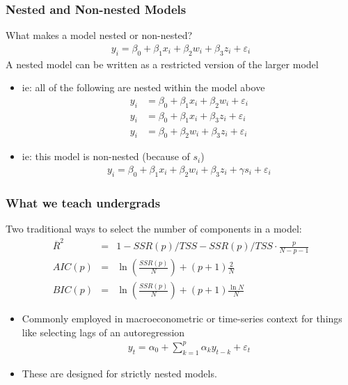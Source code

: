 \documentclass[xcolor=pdftex,dvipsnames,table,mathserif,aspectratio=169]{beamer}
\begin{document}
\begin{frame}
\frametitle{Nested and Non-nested Models}
What makes a model \alert{nested} or \alert{non-nested}?
\begin{align*}
y_i = \beta_0 + \beta_1 x_i + \beta_2 w_i + \beta_3 z_i + \varepsilon_i 
\end{align*}
A nested model can be written as a restricted version of the larger model
\begin{itemize}
\item ie: all of the following are nested within the model above
\begin{align*}
y_i &= \beta_0 + \beta_1 x_i + \beta_2 w_i + \varepsilon_i  \\
y_i &= \beta_0 + \beta_1 x_i + \beta_3 z_i + \varepsilon_i  \\
y_i &= \beta_0 + \beta_2 w_i + \beta_3 z_i + \varepsilon_i  
\end{align*}
\item ie: this model is non-nested (because of $s_i$)
\begin{align*}
y_i = \beta_0 + \beta_1 x_i + \beta_2 w_i + \beta_3 z_i + \gamma s_i +  \varepsilon_i 
\end{align*}
\end{itemize}
\end{frame}


\begin{frame}
\frametitle{What we teach undergrads}
Two traditional ways to select the number of components in a model:\\
\begin{eqnarray*}
\overline{R}^2  &=& 1-SSR(p)/TSS - SSR(p)/TSS \cdot \frac{p}{N-p-1} \\
AIC(p) &=& \ln\left(\frac{SSR(p)}{N}\right) + (p+1)\frac{2}{N}\\
BIC(p) &=& \ln \left(\frac{SSR(p)}{N} \right) + (p+1)\frac{\ln N}{N}
\end{eqnarray*}
\begin{itemize}
\item Commonly employed in macroeconometric or time-series context for things like selecting lags of an autoregression
\begin{eqnarray*}
y_t = \alpha_0 + \sum_{k=1}^p \alpha_k y_{t-k} + \varepsilon_t
\end{eqnarray*}
\item These are designed for strictly \alert{nested} models.
\end{itemize}
\end{frame}
\end{document}
